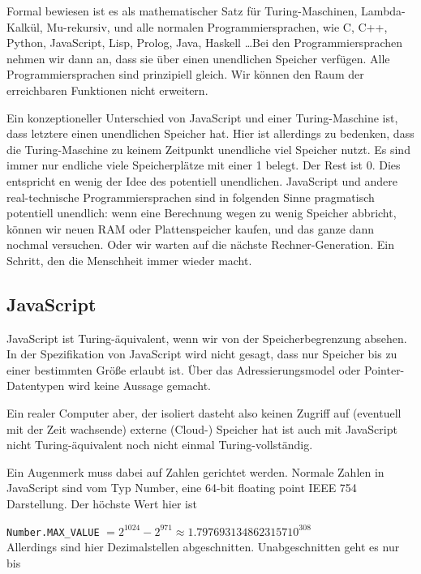 \documentclass[a4paper]{amsart}
\theoremstyle{definition}
\begin{document}
Formal bewiesen ist es als mathematischer Satz für 
Turing-Maschinen,
Lambda-Kalkül,
Mu-rekursiv, und alle normalen Programmiersprachen, wie C, C++, Python, JavaScript, Lisp, Prolog, Java, Haskell \dots Bei den Programmiersprachen nehmen wir dann an, dass sie über einen unendlichen Speicher verfügen. Alle Programmiersprachen sind prinzipiell gleich. Wir können den Raum der erreichbaren Funktionen nicht erweitern.

Ein konzeptioneller Unterschied von JavaScript und einer Turing-Maschine ist, dass letztere einen unendlichen Speicher hat. Hier ist allerdings zu bedenken, dass die Turing-Maschine zu keinem Zeitpunkt unendliche viel Speicher nutzt. Es sind immer nur endliche viele Speicherplätze mit einer 1 belegt. Der Rest ist 0. Dies entspricht en wenig der Idee des potentiell unendlichen.
JavaScript und andere real-technische Programmiersprachen sind in folgenden Sinne pragmatisch potentiell unendlich: wenn eine Berechnung wegen zu wenig Speicher abbricht, können wir neuen RAM oder Plattenspeicher kaufen, und das ganze dann nochmal versuchen. Oder wir warten auf die nächste Rechner-Generation. Ein Schritt, den die Menschheit immer wieder macht.

\subsection{JavaScript}
JavaScript ist Turing-äquivalent, wenn wir von der Speicherbegrenzung absehen. In der Spezifikation von JavaScript wird nicht gesagt, dass nur Speicher bis zu einer bestimmten Größe erlaubt ist. Über das Adressierungsmodel oder Pointer-Datentypen wird keine Aussage gemacht.

Ein realer Computer aber, der isoliert dasteht also keinen Zugriff auf (eventuell mit der Zeit wachsende) externe (Cloud-) Speicher hat ist auch mit JavaScript nicht Turing-äquivalent noch nicht einmal Turing-vollständig.

Ein Augenmerk muss dabei auf Zahlen gerichtet werden. Normale Zahlen in JavaScript sind vom Typ Number, eine 64-bit floating point IEEE 754 Darstellung. Der höchste Wert hier ist

{\tt Number.MAX\_VALUE} $= 2^{1024} - 2^{971} \approx 1.7976931348623157 10^{308}$
\\Allerdings sind hier Dezimalstellen abgeschnitten. Unabgeschnitten geht es nur bis
\end{document}
